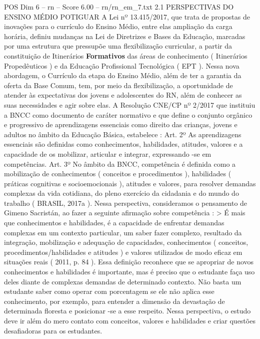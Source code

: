 \begin{textsample}{POS Dim 6 – rn – Score 6.00 – rn/rn\_em\_7.txt}  \label{ex:f6_pos_238}
2.1 PERSPECTIVAS DO ENSINO MÉDIO POTIGUAR A Lei nº 13.415/2017, que trata de propostas de inovações para o currículo do Ensino Médio, entre elas ampliação da carga horária, definiu mudanças na Lei de Diretrizes e Bases da Educação, marcadas por uma estrutura que pressupõe uma flexibilização curricular, a partir da constituição de Itinerários \textbf{Formativos} das áreas de conhecimento ( Itinerários Propedêuticos ) e da Educação Profissional Tecnológica ( EPT ).
Nessa nova abordagem, o Currículo da etapa do Ensino Médio, além de ter a garantia da oferta da Base Comum, tem, por meio da flexibilização, a oportunidade de atender às expectativas dos jovens e adolescentes do RN, além de conhecer as suas necessidades e agir sobre elas.
A Resolução CNE/CP nº 2/2017 que instituiu a BNCC como documento de caráter normativo e que define o conjunto orgânico e progressivo de aprendizagens essenciais como direito das crianças, jovens e adultos no âmbito da Educação Básica, estabelece : Art. 2º As aprendizagens essenciais são definidas como conhecimentos, habilidades, atitudes, valores e a capacidade de os mobilizar, articular e integrar, expressando -se em competências.
Art. 3º No âmbito da BNCC, competência é definida como a mobilização de conhecimentos ( conceitos e procedimentos ), habilidades ( práticas cognitivas e socioemocionais ), atitudes e valores, para resolver demandas complexas da vida cotidiana, do pleno exercício da cidadania e do mundo do trabalho ( BRASIL, 2017a ).
Nessa perspectiva, consideramos o pensamento de Gimeno Sacristán, ao fazer a seguinte afirmação sobre competência : > É mais que conhecimentos e habilidades, é a capacidade de enfrentar demandas complexas em um contexto particular, um saber fazer complexo, resultado da integração, mobilização e adequação de capacidades, conhecimentos ( conceitos, procedimentos/habilidades e atitudes ) e valores utilizados de modo eficaz em situações reais ( 2011, p. 84 ).
Essa definição reconhece que se apropriar de novos conhecimentos e habilidades é importante, mas é preciso que o estudante faça uso deles diante de complexas demandas de determinado contexto.
Não basta um estudante saber como operar com porcentagem se ele não aplica esse conhecimento, por exemplo, para entender a dimensão da devastação de determinada floresta e posicionar -se a esse respeito.
Nessa perspectiva, o estudo deve ir além do mero contato com conceitos, valores e habilidades e criar questões desafiadoras para os estudantes.

\end{textsample}
